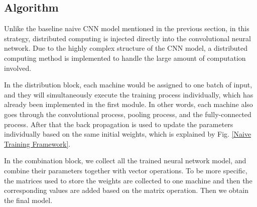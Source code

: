 \subsection{Algorithm}
Unlike the baseline naive CNN model mentioned in the previous section, in this strategy, distributed computing is injected directly into the convolutional neural network. Due to the highly complex structure of the CNN model, a distributed computing method is implemented to handle the large amount of computation involved. 

In the distribution block, each machine would be assigned to one batch of input, and they will simultaneously execute the training process individually, which has already been implemented in the first module. In other words, each machine also goes through the convolutional process, pooling process, and the fully-connected process. After that the back propagation is used to update the parameters individually based on the same initial weights, which is explained by Fig. \ref{Naive Training Framework}. 

In the combination block, we collect all the trained neural network model, and combine their parameters together with vector operations. To be more specific, the matrices used to store the weights are collected to one machine and then the corresponding values are added based on the matrix operation. Then we obtain the final model.

